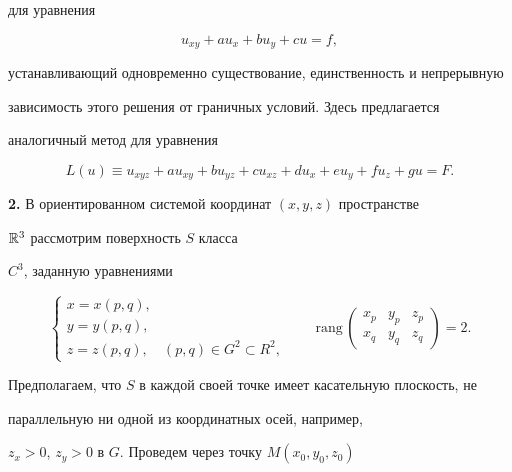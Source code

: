 для уравнения


$$


u_{xy}+au_{x}+bu_{y}+cu=f,


$$


устанавливающий одновременно существование, единственность и непрерывную


зависимость этого решения от граничных условий. Здесь предлагается


ана\-ло\-гич\-ный метод для уравнения


\begin{equation}


L(u)\equiv u_{xyz}+au_{xy}+bu_{yz}+cu_{xz}+du_{x}+eu_{y}+fu_{z}+gu=F.


\end{equation}





{\bf 2.} В ориентированном системой координат $(x,y,z)$ пространстве


$\Bbb R^3$ рассмотрим поверхность $S$ класса


$C^{3}$, заданную уравнениями


$$


\begin{cases}


x = x(p,q), &\\


y = y(p,q), &\\


z = z(p,q), &(p,q)\in G^{2}\subset R^{2},


\end{cases}


\qquad \text{rang}\,


\begin{pmatrix}


x_{p} & y_{p} & z_{p} \\


x_{q} & y_{q} & z_{q}


\end{pmatrix}


=2.


$$





Предполагаем, что $S$ в каждой своей точке имеет касательную плоскость, не


параллельную ни одной из координатных осей, например,


$z_x>0$, $z_y>0$ в $G$. Проведем через точку $M(x_{0},y_{0},z_{0})$


